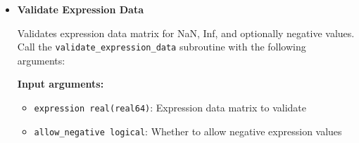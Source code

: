 \begin{enumerate}
\begin{itemize}
\begin{itemize}
                    \item \texttt{gene\_ids character(len=*)}: Gene identifier array
                          
                    \item \texttt{family\_ids character(len=*)}: Family identifier array
                          
                    \item \texttt{gene\_to\_family integer(int32)}: Gene to family mapping
                          
                    \item \texttt{expression real(real64)}: Expression data matrix
                          
                    \item \texttt{centroids real(real64)}: Family centroids matrix
                          
                    \item \texttt{shift\_vectors real(real64)}: Shift vectors matrix
                          
                    \item \texttt{ierr integer(int32)}: Error code
                  \end{itemize}
                  \begin{lstlisting}[language=Fortran, caption={Validate Data Structure}]
call validate_data_structure(n_genes, n_families, n_samples, &
                            gene_ids, family_ids, gene_to_fam, &
                            expr_data, centroids, shift_vectors, &
                            ierr)
                  \end{lstlisting}
                  
            \item \textbf{Validate Expression Data}
                  
                  Validates expression data matrix for NaN, Inf, and optionally negative
                  values. Call the \texttt{validate\_expression\_data} subroutine with the
                  following arguments:
                  
                  \textbf{Input arguments:}
                  \begin{itemize}
                    \item \texttt{expression real(real64)}: Expression data matrix to validate
                          
                    \item \texttt{allow\_negative logical}: Whether to allow negative expression
                          values
                          

\end{itemize}
\end{itemize}
\end{enumerate}
